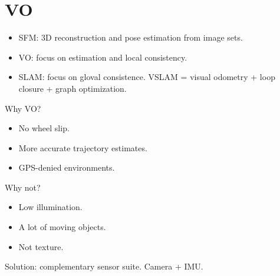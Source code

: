 \section{VO}
\begin{itemize}
  \item SFM: 3D reconstruction and pose estimation from image sets.
  \item VO: focus on estimation and local consistency.
  \item SLAM: focus on gloval consistence. VSLAM = visual odometry +
    loop closure + graph optimization.
\end{itemize}

Why VO?
\begin{itemize}
  \item No wheel slip.
  \item More accurate trajectory estimates.
  \item GPS-denied environments.
\end{itemize}

Why not?
\begin{itemize}
  \item Low illumination.
  \item A lot of moving objects.
  \item Not texture.
\end{itemize}

Solution: complementary sensor suite. Camera + IMU.
